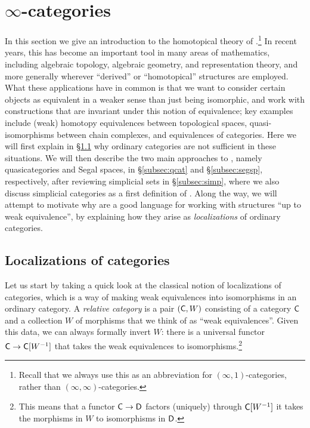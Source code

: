 \documentclass[a4paper,11pt]{article}
\begin{document}
\section{$\infty$-categories}\label{sec:icat}
In this section we give an introduction to the homotopical theory of
\icats{}.\footnote{Recall that we always use this as an abbreviation
  for $(\infty,1)$-categories, rather than
  $(\infty,\infty)$-categories.} In recent years, this has become an
important tool in many areas of mathematics, including algebraic
topology, algebraic geometry, and representation theory, and more
generally wherever ``derived'' or ``homotopical'' structures are
employed.  What these applications have in common is that we want to
consider certain objects as equivalent in a weaker sense than just
being isomorphic, and work with constructions that are invariant under
this notion of equivalence; key examples include (weak) homotopy
equivalences between topological spaces, quasi-isomorphisms between
chain complexes, and equivalences of categories. Here we will first
explain in \S\ref{subsec:loc} why ordinary categories are not
sufficient in these situations.  We will then describe the two main
approaches to \icats{}, namely quasicategories and Segal spaces, in
\S\ref{subsec:qcat} and \S\ref{subsec:segsp}, respectively, after
reviewing simplicial sets in \S\ref{subsec:simp}, where we also
discuss simplicial categories as a first definition of \icats{}. Along
the way, we will attempt to motivate why \icats{} are a good language
for working with structures ``up to weak equivalence'', by explaining
how they arise as \emph{localizations} of ordinary categories.



\subsection{Localizations of categories}\label{subsec:loc}
Let us start by taking a quick look at the classical notion of
localizations of categories, which is a way of making weak
equivalences into isomorphisms in an ordinary category.  A
\emph{relative category} is a pair $(\textup{\textsf{C}}, W)$ consisting of a category
$\textup{\textsf{C}}$ and a collection $W$ of morphisms that we think of as ``weak
equivalences''. Given this data, we can always formally invert $W$:
there is a universal functor $\uC \to \uC[W^{-1}]$ that takes the weak
equivalences to isomorphisms.\footnote{This means that a functor
  $\uC \to \uD$ factors (uniquely) through $\textup{\textsf{C}}[W^{-1}]$ \IFF{} it
  takes the morphisms in $W$ to isomorphisms in $\textup{\textsf{D}}$.}
\end{document}
